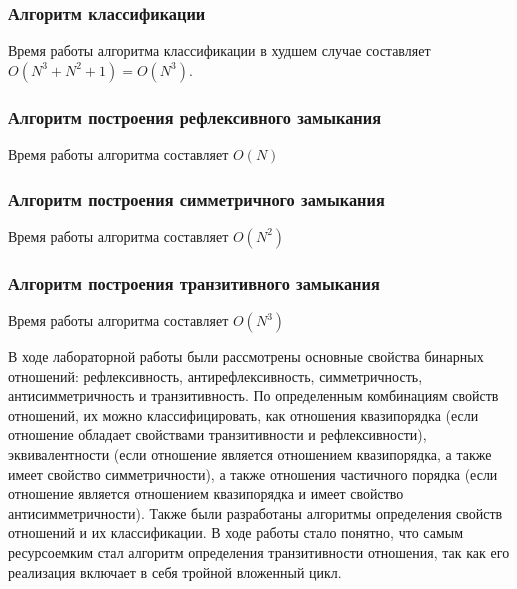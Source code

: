 \documentclass[bachelor, och, labwork]{shiza}
\begin{document}
    \subsubsection{Алгоритм классификации}
    Время работы алгоритма классификации в худшем случае составляет 
    $O(N^3 + N^2 + 1)=O(N^3)$.
    

    \subsubsection{Алгоритм построения рефлексивного замыкания}
    Время работы алгоритма составляет $O(N)$

    \subsubsection{Алгоритм построения симметричного замыкания}
    Время работы алгоритма составляет $O(N^2)$

    \subsubsection{Алгоритм построения транзитивного замыкания}
    Время работы алгоритма составляет $O(N^3)$


\conclusion
В ходе лабораторной работы были рассмотрены основные свойства бинарных отношений:
рефлексивность, антирефлексивность, симметричность, антисимметричность и 
транзитивность. По определенным комбинациям свойств отношений, их можно 
классифицировать, как отношения квазипорядка (если отношение обладает 
свойствами транзитивности и рефлексивности), эквивалентности (если отношение 
является отношением квазипорядка, а также имеет свойство симметричности), а 
также отношения частичного порядка (если отношение является отношением 
квазипорядка и имеет свойство антисимметричности). Также были разработаны 
алгоритмы определения свойств отношений и их классификации. В ходе работы стало 
понятно, что самым ресурсоемким стал алгоритм определения транзитивности 
отношения, так как его реализация включает в себя тройной вложенный цикл.
\end{document}
